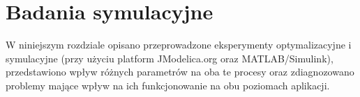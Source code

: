 \chapter{Badania symulacyjne}
\label{cha:symulacja}

W niniejszym rozdziale opisano przeprowadzone eksperymenty optymalizacyjne i symulacyjne (przy użyciu platform JModelica.org oraz MATLAB/Simulink), przedstawiono wpływ różnych parametrów na oba te procesy oraz zdiagnozowano problemy mające wpływ na ich funkcjonowanie na obu poziomach aplikacji.




